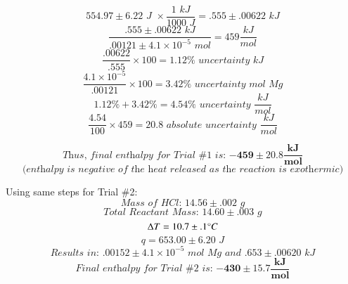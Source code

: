 \documentclass[12pt]{article}
\begin{document}
\begin{equation*}
554.97 \pm 6.22 \textit{ J } \times \frac{1 \textit{ kJ}}{1000 \textit{ J}} = .555 \pm .00622 \textit{ kJ}
\end{equation*}
\begin{equation*}
\frac{.555 \pm .00622 \textit{ kJ}}{.00121 \pm 4.1 \times 10^{-5} \textit{ mol}} = 459 \frac{kJ}{mol}
\end{equation*}
\begin{equation*}
\frac{.00622}{.555} \times 100 = 1.12\% \textit{ uncertainty kJ}
\end{equation*}
\begin{equation*}
\frac{4.1 \times 10^{-5}}{.00121} \times 100 = 3.42\% \textit{ uncertainty mol Mg}
\end{equation*}
\begin{equation*}
1.12\% + 3.42\% = 4.54\% \textit{ uncertainty } \frac{kJ}{mol}
\end{equation*}
\begin{equation*}
\frac{4.54}{100} \times 459 = 20.8 \textit{ absolute uncertainty } \frac{kJ}{mol}
\end{equation*}

\begin{equation*}
\textit{Thus, final enthalpy for Trial \#1 is: } \mathbf{-459 \pm 20.8 \frac{kJ}{mol}}
\end{equation*}
\begin{equation*}
\textit{(enthalpy is negative of the heat released as the reaction is exothermic)}
\end{equation*}

Using same steps for Trial \#2:
\begin{equation*}
\textit{Mass of HCl: } 14.56 \pm .002 \textit{ g}
\end{equation*}
\begin{equation*}
\textit{Total Reactant Mass: } 14.60 \pm .003 \textit{ g}
\end{equation*}
\begin{equation*}
\Delta T = 10.7 \pm .1 \degree C
\end{equation*}
\begin{equation*}
q = 653.00 \pm 6.20 \textit{ J}
\end{equation*}
\begin{equation*}
\textit{Results in: } .00152 \pm 4.1 \times 10^{-5} \textit{ mol Mg and } .653 \pm .00620 \textit{ kJ}
\end{equation*}
\begin{equation*}
\textit{Final enthalpy for Trial \#2 is: } \mathbf{-430 \pm 15.7 \frac{kJ}{mol}}
\end{equation*}
\end{document}
